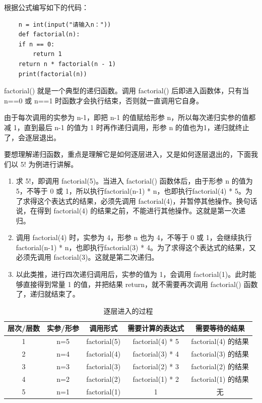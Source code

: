 根据公式编写如下的代码：
\begin{lstlisting}
    n = int(input("请输入n："))
    def factorial(n):
    if n == 0:
        return 1
    return n * factorial(n - 1)
    print(factorial(n))
\end{lstlisting}

factorial() 就是一个典型的递归函数。调用 factorial() 后即进入函数体，只有当 n==0 或 n==1 时函数才会执行结束，否则就一直调用它自身。

由于每次调用的实参为 n-1，即把 n-1 的值赋给形参 n，所以每次递归实参的值都减 1，直到最后 n-1 的值为 1 时再作递归调用，形参 n 的值也为1，递归就终止了，会逐层退出。

要想理解递归函数，重点是理解它是如何逐层进入，又是如何逐层退出的，下面我们以 5! 为例进行讲解。

{\bfseries {}}
\begin{enumerate}
    \item 求 5!，即调用 factorial(5)。当进入 factorial() 函数体后，由于形参 n 的值为 5，不等于 0 或 1，所以执行factorial(n-1) * n，也即执行factorial(4) * 5。为了求得这个表达式的结果，必须先调用 factorial(4)，并暂停其他操作。换句话说，在得到 factorial(4) 的结果之前，不能进行其他操作。这就是第一次递归。
    \item 调用 factorial(4) 时，实参为 4，形参 n 也为 4，不等于 0 或 1，会继续执行factorial(n-1) * n，也即执行factorial(3) * 4。为了求得这个表达式的结果，又必须先调用 factorial(3)。这就是第二次递归。
    \item 以此类推，进行四次递归调用后，实参的值为 1，会调用 factorial(1)。此时能够直接得到常量 1 的值，并把结果 return，就不需要再次调用 factorial() 函数了，递归就结束了。
\end{enumerate}

\begin{table}[ht]
    \centering
    \caption*{逐层进入的过程}
    \begin{tabular}{@{}ccccc@{}}
    \toprule
    层次/层数 & 实参/形参 & 调用形式         & 需要计算的表达式         & 需要等待的结果          \\ \midrule
    1     & n=5   & factorial(5) & factorial(4) * 5 & factorial(4) 的结果 \\
    2     & n=4   & factorial(4) & factorial(3) * 4 & factorial(3) 的结果 \\
    3     & n=3   & factorial(3) & factorial(2) * 3 & factorial(2) 的结果 \\
    4     & n=2   & factorial(2) & factorial(1) * 2 & factorial(1) 的结果 \\
    5     & n=1   & factorial(1) & 1                & 无                \\ \bottomrule
    \end{tabular}
    \end{table}

